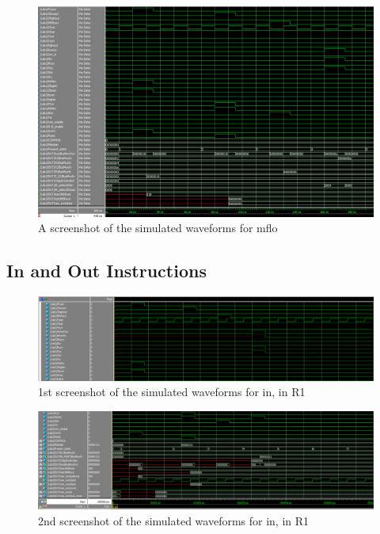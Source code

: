 \documentclass{article}
\begin{document}
                \begin{figure}[h!]
                    \begin{center}
                        \includegraphics[width=15cm]{mflo_wave.png}
                        \caption{A screenshot of the simulated waveforms for mflo}
                    \end{center}
                \end{figure}

    \subsection{In and Out Instructions}
                
        \begin{figure}[h!]
            \begin{center}
                \includegraphics[width=15cm]{in_wave_top_half.png}
                \caption{1st screenshot of the simulated waveforms for in, in R1}
            \end{center}
        \end{figure}

        \begin{figure}[h!]
            \begin{center}
                \includegraphics[width=15cm]{in_wave_bottom_half.png}
                \caption{2nd screenshot of the simulated waveforms for in, in R1}
            \end{center}
        \end{figure}
        
\end{document}
